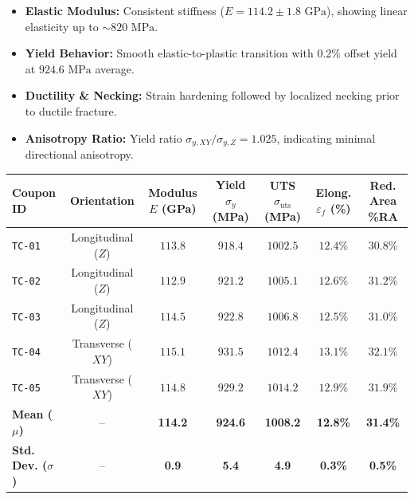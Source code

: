 \documentclass[10pt,a4paper,parskip=half]{scrartcl}
\begin{document}
\begin{minipage}[t]{0.49\textwidth}
\begin{tcolorbox}[title={\faInfoCircle\ Tensile Test Observations}, colframe=brandprimary, colback=white, left=5pt, right=5pt, top=3pt, bottom=3pt]
\small
\begin{itemize}[leftmargin=*, label=\textcolor{brandsecondary}{\small\faCheck}]
    \item \textbf{Elastic Modulus:} Consistent stiffness ($E = 114.2 \pm 1.8\text{ GPa}$), showing linear elasticity up to $\sim 820\text{ MPa}$.
    \item \textbf{Yield Behavior:} Smooth elastic-to-plastic transition with 0.2\% offset yield at $924.6\text{ MPa}$ average.
    \item \textbf{Ductility \& Necking:} Strain hardening followed by localized necking prior to ductile fracture.
    \item \textbf{Anisotropy Ratio:} Yield ratio $\sigma_{y,XY} / \sigma_{y,Z} = 1.025$, indicating minimal directional anisotropy.
\end{itemize}
\end{tcolorbox}
\end{minipage}

\vspace{1mm}
\noindent
{}
\vspace{-1mm}
{\small
\begin{tabularx}{\textwidth}{@{}lCCCCCC@{}}
\toprule
{}
\textbf{Coupon ID} & \textbf{Orientation} & \textbf{Modulus $E$ (GPa)} & \textbf{Yield $\sigma_y$ (MPa)} & \textbf{UTS $\sigma_{\text{uts}}$ (MPa)} & \textbf{Elong. $\varepsilon_f$ (\%)} & \textbf{Red. Area \%RA} \\
\midrule
\texttt{TC-01} & Longitudinal ($Z$) & $113.8$ & $918.4$ & $1002.5$ & $12.4\%$ & $30.8\%$ \\
\texttt{TC-02} & Longitudinal ($Z$) & $112.9$ & $921.2$ & $1005.1$ & $12.6\%$ & $31.2\%$ \\
\texttt{TC-03} & Longitudinal ($Z$) & $114.5$ & $922.8$ & $1006.8$ & $12.5\%$ & $31.0\%$ \\
\texttt{TC-04} & Transverse ($XY$) & $115.1$ & $931.5$ & $1012.4$ & $13.1\%$ & $32.1\%$ \\
\texttt{TC-05} & Transverse ($XY$) & $114.8$ & $929.2$ & $1014.2$ & $12.9\%$ & $31.9\%$ \\
\midrule
{}
\textbf{Mean ($\mu$)} & -- & \textbf{114.2} & \textbf{924.6} & \textbf{1008.2} & \textbf{12.8\%} & \textbf{31.4\%} \\
\textbf{Std. Dev. ($\sigma$)} & -- & \textbf{0.9} & \textbf{5.4} & \textbf{4.9} & \textbf{0.3\%} & \textbf{0.5\%} \\
\bottomrule
\end{tabularx}
}
\end{document}
